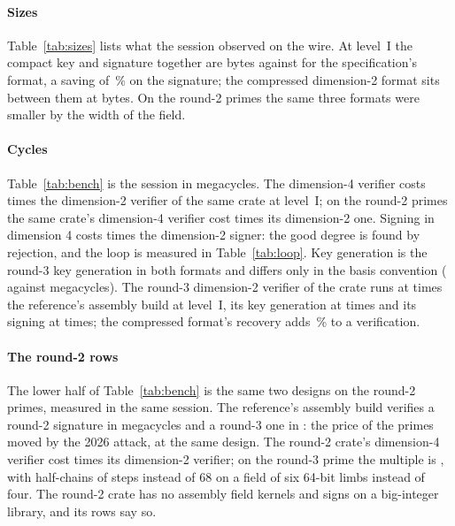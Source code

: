 \documentclass[11pt]{article}
\begin{document}
\paragraph{Sizes}
Table~\ref{tab:sizes} lists what the session observed on the wire.  At
level~I the compact key and signature together are \ComboCompactI{} bytes
against \ComboStdI{} for the specification's format, a saving of
\SigSavingPct\,\% on the signature; the compressed dimension-2 format sits
between them at \SigCompI{} bytes.  On the round-2 primes the same three
formats were smaller by the width of the field.

\begin{table}[H]
\centering
\caption{Public key + signature = total, in bytes, as observed in the
session.  Compact formats are level~I only.}
\label{tab:sizes}
\small

\end{table}

\paragraph{Cycles}
Table~\ref{tab:bench} is the session in megacycles.  The dimension-4
verifier costs \VerMultI{} times the dimension-2 verifier of the same
crate at level~I; on the round-2 primes the same crate's dimension-4
verifier cost \VerRtwoMultI{} times its dimension-2 one.  Signing in
dimension 4 costs \SignMultI{} times the dimension-2 signer: the good
degree is found by rejection, and the loop is measured in
Table~\ref{tab:loop}.  Key generation is the round-3 key generation in
both formats and differs only in the basis convention
(\KeygenCompactI{} against \KeygenStdI{} megacycles).  The round-3
dimension-2 verifier of the crate runs at \VerStdOverCrefI{} times the
reference's assembly build at level~I, its key generation at
\KeygenStdOverCrefI{} times and its signing at \SignStdOverCrefI{}
times; the compressed format's recovery adds \VerCompOverStdPct\,\% to a
verification.

\paragraph{The round-2 rows}
The lower half of Table~\ref{tab:bench} is the same two designs on the
round-2 primes, measured in the same session.  The reference's assembly
build verifies a round-2 signature in \VerCrefRtwoI{} megacycles and a
round-3 one in \VerCrefI{}: the price of the primes moved by the 2026
attack, at the same design.  The round-2 crate's dimension-4 verifier cost
\VerRtwoMultI{} times its dimension-2 verifier; on the round-3 prime the
multiple is \VerMultI{}, with half-chains of \HalfStepsI{} steps instead
of 68 on a field of six 64-bit limbs instead of four.  The round-2 crate
has no assembly field kernels and signs on a big-integer library, and its
rows say so.
\end{document}
